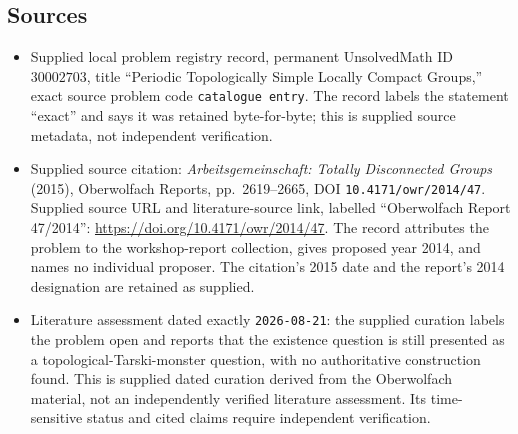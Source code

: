 \documentclass[11pt]{article}
\begin{document}
\subsection{Sources}
\begin{itemize}
\item Supplied local problem registry record, permanent UnsolvedMath ID \(30002703\), title ``Periodic Topologically Simple Locally Compact Groups,'' exact source problem code \texttt{catalogue entry}. The record labels the statement ``exact'' and says it was retained byte-for-byte; this is supplied source metadata, not independent verification.
\item Supplied source citation: \emph{Arbeitsgemeinschaft: Totally Disconnected Groups} (2015), Oberwolfach Reports, pp.\ 2619--2665, DOI \texttt{10.4171/owr/2014/47}. Supplied source URL and literature-source link, labelled ``Oberwolfach Report 47/2014'': \url{https://doi.org/10.4171/owr/2014/47}. The record attributes the problem to the workshop-report collection, gives proposed year 2014, and names no individual proposer. The citation's 2015 date and the report's 2014 designation are retained as supplied.
\item Literature assessment dated exactly \texttt{2026-08-21}: the supplied curation labels the problem open and reports that the existence question is still presented as a topological-Tarski-monster question, with no authoritative construction found. This is supplied dated curation derived from the Oberwolfach material, not an independently verified literature assessment. Its time-sensitive status and cited claims require independent verification.
\end{itemize}
\end{document}
